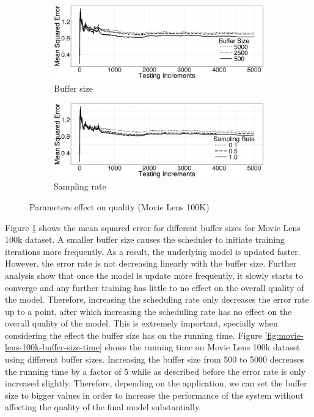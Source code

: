 \documentclass{vldb}
\begin{document}
\begin{figure}[h]
\begin{subfigure}{\columnwidth}
\centering
\includegraphics[width=\columnwidth]{../images/experiment-results/movie-lens-buffer-quality-improved.eps}
\caption{Buffer size}
\label{fig:movie-lens-100k-buffer-size-mse}
\end{subfigure}
\begin{subfigure}{\columnwidth}
\centering
\includegraphics[width=\columnwidth]{../images/experiment-results/movie-lens-sampling-quality-improved.eps}
\caption{Sampling rate}
\label{fig:movie-lens-100k-sample-rate}
\end{subfigure}
\vspace{2mm}
\caption{Parameters effect on quality (Movie Lens 100K)}
\end{figure}

Figure \ref{fig:movie-lens-100k-buffer-size-mse} shows the mean squared error for different buffer sizes for Movie Lens 100k dataset. 
A smaller buffer size causes the scheduler to initiate training iterations more frequently.
As a result, the underlying model is updated faster.
However, the error rate is not decreasing linearly with the buffer size.
Further analysis show that once the model is update more frequently, it slowly starts to converge and any further training has little to no effect on the overall quality of the model.
Therefore, increasing the scheduling rate only decreases the error rate up to a point, after which increasing the scheduling rate has no effect on the overall quality of the model.
This is extremely important, specially when considering the effect the buffer size has on the running time.
Figure \ref{fig:movie-lens-100k-buffer-size-time} shows the running time on Movie Lens 100k dataset using different buffer sizes. 
Increasing the buffer size from 500 to 5000 decreases the running time by a factor of 5 while as described before the error rate is only increased slightly.
Therefore, depending on the application, we can set the buffer size to bigger values in order to increase the performance of the system without affecting the quality of the final model substantially.
\end{document}

